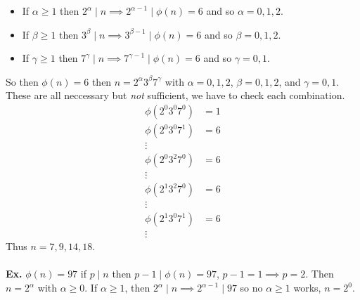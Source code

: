 \documentclass[class=article, crop=false]{standalone}
\begin{document}
\begin{enumerate}
\begin{enumerate}[(a)]
	\begin{itemize}
		\item If $\alpha\geq 1$ then $2^{\alpha}\mid n\implies 2^{\alpha-1}\mid\phi(n)=6$ and so $\alpha = 0,1,2$.
		\item If $\beta\geq 1$ then $3^{\beta}\mid n\implies 3^{\beta -1}\mid\phi(n)=6$ and so $\beta = 0,1,2$.
		\item If $\gamma\geq 1$ then $7^{\gamma}\mid n\implies 7^{\gamma -1}\mid\phi(n)=6$ and so $\gamma = 0,1$.
	\end{itemize}
	So then $\phi(n) = 6$ then $n=2^{\alpha} 3^{\beta} 7^{\gamma}$ with $\alpha=0,1,2$, $\beta=0,1,2$, and $\gamma=0,1$.
	These are all neccessary but \emph{not} sufficient, we have to check each combination.
	\begin{align*}
		\phi(2^0 3^0 7^0) &= 1 \\
		\phi(2^0 3^0 7^1) &= 6 \\
		\vdots \\
		\phi(2^0 3^2 7^0) &= 6 \\
		\vdots \\
		\phi(2^1 3^2 7^0) &= 6 \\
		\vdots \\
		\phi(2^1 3^0 7^1) &= 6 \\
		\vdots
	\end{align*}
	Thus $n = 7,9,14,18$. \\\\

	\textbf{Ex.} $\phi(n)=97$ if $p\mid n$ then $p-1\mid \phi(n)=97$, $p-1=1\implies p = 2$.
	Then $n = 2^{\alpha}$ with $\alpha\geq 0$. If $\alpha \geq 1$, then $2^{\alpha}\mid n\implies 2^{\alpha -1}\mid 97$ so no
	$\alpha \geq 1$ works, $n = 2^0$.

\end{enumerate}


\end{enumerate}

\end{document}
